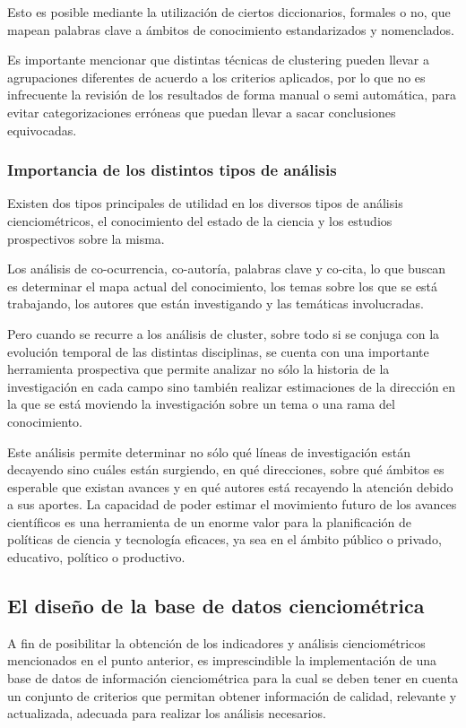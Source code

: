 Esto es posible mediante la utilización de ciertos diccionarios, formales o no, que mapean palabras clave a ámbitos de conocimiento estandarizados y nomenclados.

Es importante mencionar que distintas técnicas de clustering pueden llevar a agrupaciones diferentes de acuerdo a los criterios aplicados, por lo que no es infrecuente la revisión de los resultados de forma manual o semi automática, para evitar categorizaciones erróneas que puedan llevar a sacar conclusiones equivocadas.

\subsubsection{Importancia de los distintos tipos de análisis}

Existen dos tipos principales de utilidad en los diversos tipos de análisis cienciométricos, el conocimiento del estado de la ciencia y los estudios prospectivos sobre la misma.

Los análisis de co-ocurrencia, co-autoría, palabras clave y co-cita, lo que buscan es determinar el mapa actual del conocimiento, los temas sobre los que se está trabajando, los autores que están investigando y las temáticas involucradas.

Pero cuando se recurre a los análisis de cluster, sobre todo si se conjuga con la evolución temporal de las distintas disciplinas, se cuenta con una importante herramienta prospectiva que permite analizar no sólo la historia de la investigación en cada campo sino también realizar estimaciones de la dirección en la que se está moviendo la investigación sobre un tema o una rama del conocimiento.

Este análisis permite determinar no sólo qué líneas de investigación están decayendo sino cuáles están surgiendo, en qué direcciones, sobre qué ámbitos es esperable que existan avances y en qué autores está recayendo la atención debido a sus aportes. La capacidad de poder estimar el movimiento futuro de los avances científicos es una herramienta de un enorme valor para la planificación de políticas de ciencia y tecnología eficaces, ya sea en el ámbito público o privado, educativo, político o productivo.

\subsection{El diseño de la base de datos cienciométrica}

A fin de posibilitar la obtención de los indicadores y análisis cienciométricos mencionados en el punto anterior, es imprescindible la implementación de una base de datos de información cienciométrica para la cual se deben tener en cuenta un conjunto de criterios que permitan obtener información de calidad, relevante y actualizada, adecuada para realizar los análisis necesarios.

